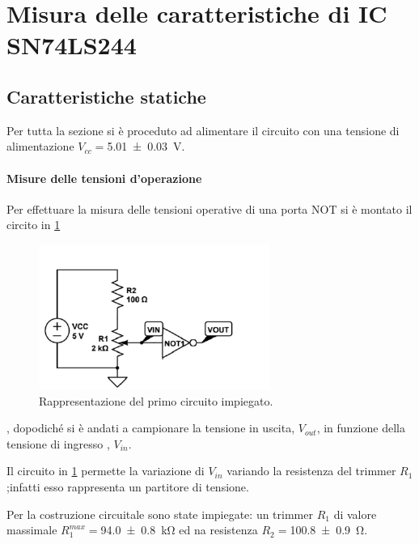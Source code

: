\section{Misura delle caratteristiche di IC SN74LS244 }
\subsection{Caratteristiche statiche}
Per tutta la sezione si è proceduto ad alimentare il circuito con una tensione di alimentazione $V_{cc} =$\SI{5.01 \pm 0.03}{\volt}.
\paragraph{Misure delle tensioni d'operazione}
Per effettuare la misura delle tensioni operative di una porta NOT si 
è montato il circito in \figurename{ \ref{f:c1}}
\begin{figure}[h]
	\includegraphics[scale=1.0]{../Figs-Tabs/immagine1.png}
	\caption{Rappresentazione del primo circuito impiegato.}
	\label{f:c1}
\end{figure} ,
dopodiché si è andati a  campionare la tensione in uscita, $V_{out}$, in funzione della tensione di ingresso , $V_{in}$.

Il circuito in  \figurename{ \ref{f:c1}} permette la variazione di  $V_{in}$ variando la resistenza del trimmer $R_{1}$;infatti esso  rappresenta un partitore di tensione.

Per la costruzione circuitale sono state impiegate: un trimmer $R_{1}$ di valore massimale $R_{1}^{max}=$\SI{94.0 \pm 0.8 }{\kilo \ohm} ed na resistenza $R_{2}=$\SI{100.8 \pm 0.9 }{ \ohm}.

